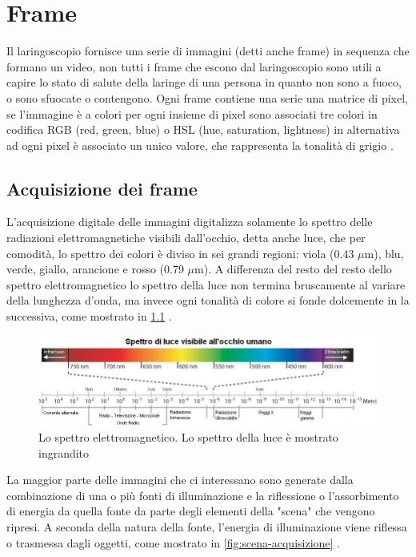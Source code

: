 \chapter{Frame}\label{frame}

Il laringoscopio fornisce una serie di immagini (detti anche frame) in sequenza che formano un video, non tutti i frame che escono dal laringoscopio sono utili a capire lo stato di salute della laringe di una persona in quanto non sono a fuoco, o sono sfuocate o contengono. Ogni frame contiene una serie una matrice di pixel, se l'immagine è a colori per ogni insieme di pixel sono associati tre colori in codifica RGB (red, green, blue) o HSL (hue, saturation, lightness) in alternativa ad ogni pixel è associato un unico valore, che rappresenta la tonalità di grigio \cite{gonzalez_dip}.

\section{Acquisizione dei frame}\label{acquisizione-dei-frame}

L'acquisizione digitale delle immagini digitalizza solamente lo spettro delle radiazioni elettromagnetiche visibili dall'occhio, detta anche luce, che per comodità, lo spettro dei colori è diviso in sei grandi regioni: viola (0.43 \(\mu \)m), blu, verde, giallo, arancione e rosso (0.79 \(\mu \)m). A differenza del resto del resto dello spettro elettromagnetico lo spettro della luce non termina bruscamente al variare della lunghezza d'onda, ma invece ogni tonalità di colore si fonde dolcemente in
la successiva, come mostrato in \cref{fig:spettro-onde} \cite{gonzalez_dip}.

\begin{figure}[ht]
    \centering
    \includegraphics[width=1\textwidth]{frame/Spettro-onde.jpg}
    \caption{Lo spettro elettromagnetico. Lo spettro della luce è mostrato ingrandito}
    \label{fig:spettro-onde}
\end{figure}

La maggior parte delle immagini che ci interessano sono generate dalla combinazione di una o più fonti di illuminazione e la riflessione o l'assorbimento di energia da quella fonte da parte degli elementi della "scena" che vengono ripresi. A seconda della natura della fonte, l'energia di illuminazione viene riflessa o trasmessa dagli oggetti, come mostrato in \cref{fig:scena-acquisizione} \cite{gonzalez_dip}.

